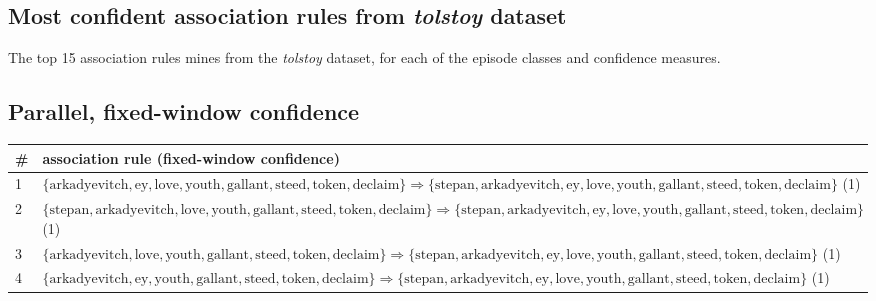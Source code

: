 \begin{appendices}

\chapter{Most confident association rules from \emph{tolstoy} dataset}

The top 15 association rules mines from the \emph{tolstoy} dataset, for each of the episode classes and confidence measures.

\section{Parallel, fixed-window confidence}

\begin{longtable}{p{20pt}|p{\dimexpr\textwidth-\tabcolsep-20pt\relax}}
\# & association rule (fixed-window confidence) \\
\hline
1 & $ \{ \text{arkadyevitch},\allowbreak\text{ey},\allowbreak\text{love},\allowbreak\text{youth},\allowbreak\text{gallant},\allowbreak\text{steed},\allowbreak\text{token},\allowbreak\text{declaim} \} \Rightarrow \{ \text{stepan},\allowbreak\text{arkadyevitch},\allowbreak\text{ey},\allowbreak\text{love},\allowbreak\text{youth},\allowbreak\text{gallant},\allowbreak\text{steed},\allowbreak\text{token},\allowbreak\text{declaim} \} $ (1) \\
2 & $ \{ \text{stepan},\allowbreak\text{arkadyevitch},\allowbreak\text{love},\allowbreak\text{youth},\allowbreak\text{gallant},\allowbreak\text{steed},\allowbreak\text{token},\allowbreak\text{declaim} \} \Rightarrow \{ \text{stepan},\allowbreak\text{arkadyevitch},\allowbreak\text{ey},\allowbreak\text{love},\allowbreak\text{youth},\allowbreak\text{gallant},\allowbreak\text{steed},\allowbreak\text{token},\allowbreak\text{declaim} \} $ (1) \\
3 & $ \{ \text{arkadyevitch},\allowbreak\text{love},\allowbreak\text{youth},\allowbreak\text{gallant},\allowbreak\text{steed},\allowbreak\text{token},\allowbreak\text{declaim} \} \Rightarrow \{ \text{stepan},\allowbreak\text{arkadyevitch},\allowbreak\text{ey},\allowbreak\text{love},\allowbreak\text{youth},\allowbreak\text{gallant},\allowbreak\text{steed},\allowbreak\text{token},\allowbreak\text{declaim} \} $ (1) \\
4 & $ \{ \text{arkadyevitch},\allowbreak\text{ey},\allowbreak\text{youth},\allowbreak\text{gallant},\allowbreak\text{steed},\allowbreak\text{token},\allowbreak\text{declaim} \} \Rightarrow \{ \text{stepan},\allowbreak\text{arkadyevitch},\allowbreak\text{ey},\allowbreak\text{love},\allowbreak\text{youth},\allowbreak\text{gallant},\allowbreak\text{steed},\allowbreak\text{token},\allowbreak\text{declaim} \} $ (1) \\

\end{longtable}
\end{appendices}

